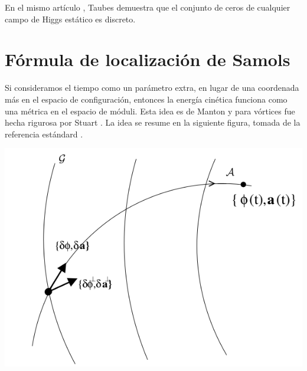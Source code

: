 \documentclass[spanish]{amsart}
\begin{document}
En el mismo artículo \cite{taubes1980}, Taubes demuestra que el
conjunto de ceros de cualquier campo de Higgs estático es discreto.

\section{Fórmula de localización de Samols}
\label{sec:samols-localization-formula}

Si consideramos el tiempo como un parámetro extra, en lugar de una
coordenada más en el espacio de configuración, entonces la energía
cinética funciona como una métrica en el espacio de móduli. Esta idea
es de Manton \cite{manton198254} y para vórtices fue hecha rigurosa
por Stuart \cite{stuart1994dynamics}. La idea se resume en la
siguiente figura, tomada de la referencia estándard
\cite{manton2004topological}.

\begin{center}
  \includegraphics[width=0.3\linewidth]{img/mantons-idea}
\end{center}
\end{document}

